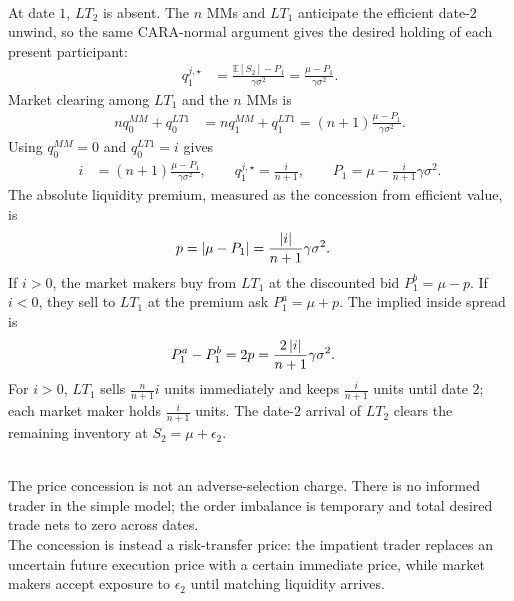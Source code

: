 \documentclass[a4paper,oneside,openany]{book}
\begin{document}
\begin{model}
\par\smallskip\noindent{}\\
At date $1$, $LT_2$ is absent. The $n$ MMs and $LT_1$ anticipate the efficient date-$2$ unwind, so the same CARA-normal argument gives the desired holding of each present participant:
\begin{align*}
q_1^{j,\star}&=\frac{\mathbb{E}[S_2]-P_1}{\gamma\sigma^2}=\frac{\mu-P_1}{\gamma\sigma^2}.
\end{align*}
Market clearing among $LT_1$ and the $n$ MMs is
\begin{align*}
nq_0^{MM}+q_0^{LT1}
&=nq_1^{MM}+q_1^{LT1}=(n+1)\frac{\mu-P_1}{\gamma\sigma^2}.
\end{align*}
Using $q_0^{MM}=0$ and $q_0^{LT1}=i$ gives
\begin{align*}
i&=(n+1)\frac{\mu-P_1}{\gamma\sigma^2}, \qquad q_1^{j,\star}=\frac{i}{n+1}, \qquad P_1=\mu-\frac{i}{n+1}\gamma\sigma^2.
\end{align*}
The absolute liquidity premium, measured as the concession from efficient value, is
\begin{align*}
p&=\left\lvert\mu-P_1\right\rvert=\frac{\left\lvert i\right\rvert}{n+1}\gamma\sigma^2.
\end{align*}
If $i>0$, the market makers buy from $LT_1$ at the discounted bid $P_1^b=\mu-p$. If $i<0$, they sell to $LT_1$ at the premium ask $P_1^a=\mu+p$. The implied inside spread is
\begin{align*}
P_1^a-P_1^b&=2p=\frac{2\left\lvert i\right\rvert}{n+1}\gamma\sigma^2.
\end{align*}
For $i>0$, $LT_1$ sells $\frac{n}{n+1}i$ units immediately and keeps $\frac{i}{n+1}$ units until date $2$; each market maker holds $\frac{i}{n+1}$ units. The date-$2$ arrival of $LT_2$ clears the remaining inventory at $S_2=\mu+\epsilon_2$.

\par\smallskip\noindent{}\\
The price concession is not an adverse-selection charge. There is no informed trader in the simple model; the order imbalance is temporary and total desired trade nets to zero across dates.\\
The concession is instead a risk-transfer price: the impatient trader replaces an uncertain future execution price with a certain immediate price, while market makers accept exposure to $\epsilon_2$ until matching liquidity arrives.


\end{model}
\end{document}
